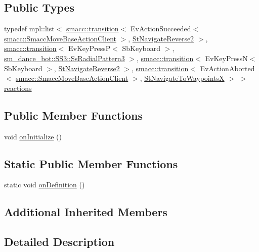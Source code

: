 \subsection*{Public Types}
\begin{DoxyCompactItemize}
\item 
typedef mpl\+::list$<$ \hyperlink{classsmacc_1_1transition}{smacc\+::transition}$<$ Ev\+Action\+Succeeded$<$ \hyperlink{classsmacc_1_1SmaccMoveBaseActionClient}{smacc\+::\+Smacc\+Move\+Base\+Action\+Client} $>$, \hyperlink{structStNavigateReverse2}{St\+Navigate\+Reverse2} $>$, \hyperlink{classsmacc_1_1transition}{smacc\+::transition}$<$ Ev\+Key\+PressP$<$ Sb\+Keyboard $>$, \hyperlink{structsm__dance__bot_1_1SS3_1_1SsRadialPattern3}{sm\+\_\+dance\+\_\+bot\+::\+S\+S3\+::\+Ss\+Radial\+Pattern3} $>$, \hyperlink{classsmacc_1_1transition}{smacc\+::transition}$<$ Ev\+Key\+PressN$<$ Sb\+Keyboard $>$, \hyperlink{structStNavigateReverse2}{St\+Navigate\+Reverse2} $>$, \hyperlink{classsmacc_1_1transition}{smacc\+::transition}$<$ Ev\+Action\+Aborted$<$ \hyperlink{classsmacc_1_1SmaccMoveBaseActionClient}{smacc\+::\+Smacc\+Move\+Base\+Action\+Client} $>$, \hyperlink{structStNavigateToWaypointsX}{St\+Navigate\+To\+WaypointsX} $>$ $>$ \hyperlink{structStRotateDegrees4_acb8e790db5fff7363129203e66397dc9}{reactions}
\end{DoxyCompactItemize}
\subsection*{Public Member Functions}
\begin{DoxyCompactItemize}
\item 
void \hyperlink{structStRotateDegrees4_a25d516dde465ddfedc3a875fd93b9f47}{on\+Initialize} ()
\end{DoxyCompactItemize}
\subsection*{Static Public Member Functions}
\begin{DoxyCompactItemize}
\item 
static void \hyperlink{structStRotateDegrees4_a7a48915b131de32dc273376c9d3522ac}{on\+Definition} ()
\end{DoxyCompactItemize}
\subsection*{Additional Inherited Members}


\subsection{Detailed Description}


